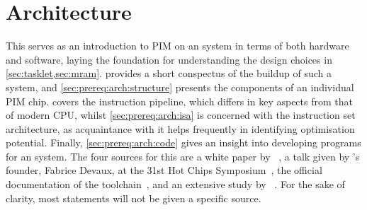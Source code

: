 \section{Architecture}
\label{sec:prereq:arch}

This  serves as an introduction to \ac{PIM} on an \upmem{} system in terms of both hardware and software, laying the foundation for understanding the design choices in \cref{sec:tasklet,sec:mram}.
 provides a short conspectus of the buildup of such a system, and \cref{sec:prereq:arch:structure} presents the components of an individual \ac{PIM} chip.
 covers the instruction pipeline, which differs in key aspects from that of modern \ac{CPU}, whilst \cref{sec:prereq:arch:isa} is concerned with the instruction set architecture, as acquaintance with it helps frequently in identifying optimisation potential.
Finally, \cref{sec:prereq:arch:code} gives an insight into developing programs for an \upmem{} system.
The four sources for this  are a white paper by \upmem{}~\cite{upmem2021WhitePaper}, a talk given by \upmem{}'s founder, Fabrice Devaux, at the 31st Hot Chips Symposium~\cite{upmem2019HotChips}, the official documentation of the \upmem{} toolchain~\cite{upmemSDK}, and an extensive study by \citeauthor{mutlu2022Benchmarking}~\cite{mutlu2022Benchmarking}.
For the sake of clarity, most statements will not be given a specific source.










